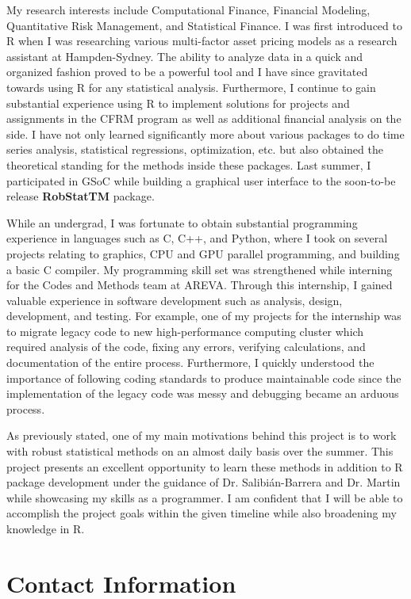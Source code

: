\documentclass[english]{article}\usepackage[]{graphicx}\usepackage[]{color}
\begin{document}
My research interests include Computational Finance, Financial Modeling, Quantitative Risk Management, and Statistical Finance. I was first introduced to R when I was researching various multi-factor asset pricing models as a research assistant at Hampden-Sydney. The ability to analyze data in a quick and organized fashion proved to be a powerful tool and I have since gravitated towards using R for any statistical analysis. Furthermore, I continue to gain substantial experience using R to implement solutions for projects and assignments in the CFRM program as well as additional financial analysis on the side. I have not only learned significantly more about various packages to do time series analysis, statistical regressions, optimization, etc. but also obtained the theoretical standing for the methods inside these packages. Last summer, I participated in GSoC while building a graphical user interface to the soon-to-be release \textbf{RobStatTM} package.

While an undergrad, I was fortunate to obtain substantial programming experience in languages such as C, C++, and Python, where I took on several projects relating to graphics, CPU and GPU parallel programming, and building a basic C compiler. My programming skill set was strengthened while interning for the Codes and Methods team at AREVA.  Through this internship, I gained valuable experience in software development such as analysis, design, development, and testing. For example, one of my projects for the internship was to migrate legacy code to new high-performance computing cluster which required analysis of the code, fixing any errors, verifying calculations, and documentation of the entire process. Furthermore, I quickly understood the importance of following coding standards to produce maintainable code since the implementation of the legacy code was messy and debugging became an arduous process.

As previously stated, one of my main motivations behind this project is to work with robust statistical methods on an almost daily basis over the summer. This project presents an excellent opportunity to learn these methods in addition to R package development under the guidance of Dr. Salibián-Barrera and Dr. Martin while showcasing my skills as a programmer. I am confident that I will be able to accomplish the project goals within the given timeline while also broadening my knowledge in R.

\section*{Contact Information}
\end{document}
